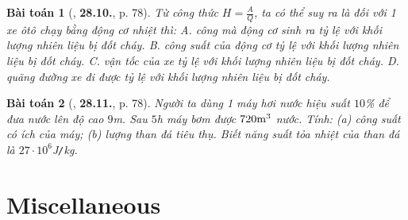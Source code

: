 \documentclass{article}
\numberwithin{equation}{section}
\newtheorem{baitoan}{Bài toán}
\begin{document}
\begin{baitoan}[\cite{SBT_Vat_Ly_8}, \textbf{28.10.}, p. 78]
	Từ công thức $H = \frac{A}{Q}$, ta có thể suy ra là đối với 1 xe ôtô chạy bằng động cơ nhiệt thì: {\sf A.} công mà động cơ sinh ra tỷ lệ với khối lượng nhiên liệu bị đốt cháy. {\sf B.} công suất của động cơ tỷ lệ với khối lượng nhiên liệu bị đốt cháy. {\sf C.} vận tốc của xe tỷ lệ với khối lượng nhiên liệu bị đốt cháy. {\sf D.} quãng đường xe đi được tỷ lệ với khối lượng nhiên liệu bị đốt cháy.
\end{baitoan}

\begin{baitoan}[\cite{SBT_Vat_Ly_8}, \textbf{28.11.}, p. 78]
	Người ta dùng 1 máy hơi nước hiệu suất $10$\% để đưa nước lên độ cao $9$\emph{m}. Sau $5$\emph{h} máy bơm được $720\rm m^3$ nước. Tính: (a) công suất có ích của máy; (b) lượng than đá tiêu thụ. Biết năng suất tỏa nhiệt của than đá là $27\cdot10^6$\emph{J\texttt{/}kg}.
\end{baitoan}


\section{Miscellaneous}


\printbibliography[heading=bibintoc]
	
\end{document}
